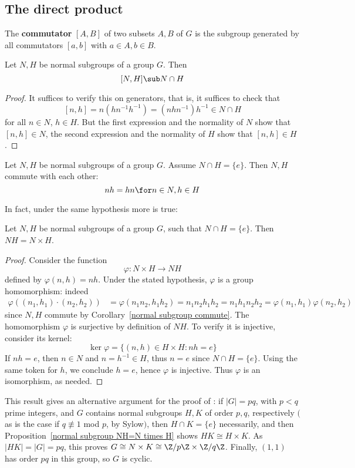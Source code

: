 \subsection{The direct product}
The \textbf{commutator} $[A,B]$ of two subsets $A,B$ of $G$ is the subgroup generated by all commutators $[a,b]$ with $a\in A, b\in B$.
\begin{lemma}\label{commutator normal subgroup}
Let $N,H$ be normal subgroups of a group $G$. Then
\[[N,H]\sub N\cap H\]
\end{lemma}
\begin{proof}
It suffices to verify this on generators, that is, it suffices to check that
\[[n,h]=n(hn^{-1}h^{-1})=(nhn^{-1})h^{-1}\in N\cap H\]
for all $n\in N$, $h\in H$. But the first expression and the normality of $N$ show that $[n,h]\in N$, the second expression and the normality of $H$ show that $[n,h]\in H$.
\end{proof}
\begin{corollary}\label{normal subgroup commute}
Let $N,H$ be normal subgroups of a group $G$. Assume $N\cap H=\{e\}$. Then $N,H$ commute with each other:
\[nh=hn\for n\in N,h\in H\]
\end{corollary}
In fact, under the same hypothesis more is true:
\begin{proposition}\label{normal subgroup NH=N times H}
Let $N,H$ be normal subgroups of a group $G$, such that $N\cap H=\{e\}$. Then $NH=N\times H$.
\end{proposition}
\begin{proof}
Consider the function
\[\varphi:N\times H\to NH\]
defined by $\varphi(n,h)=nh$. Under the stated hypothesis, $\varphi$ is a group homomorphism: indeed
\begin{align*}
\varphi((n_1,h_1)\cdot(n_2,h_2))&=\varphi(n_1n_2,h_1h_2)=n_1n_2h_1h_2=n_1h_1n_2h_2=\varphi(n_1,h_1)\varphi(n_2,h_2)
\end{align*}
since $N,H$ commute by Corollary~\ref{normal subgroup commute}. The homomorphism $\varphi$ is surjective by definition of $NH$. To verify it is injective, consider its kernel:
\[\ker\varphi=\{(n,h)\in H\times H:nh=e\}\]
If $nh=e$, then $n\in N$ and $n=h^{-1}\in H$, thus $n=e$ since $N\cap H=\{e\}$. Using the same token for $h$, we conclude $h=e$, hence $\varphi$ is injective. Thus $\varphi$ is an isomorphism, as needed.
\end{proof}
\begin{remark}
This result gives an alternative argument for the proof of : if $|G|=pq$, with $p<q$ prime integers, and $G$ contains normal subgroups $H,K$ of order $p,q$, respectively $($as is the case if $q\not\equiv 1$ mod $p$, by Sylow$)$, then $H\cap K=\{e\}$ necessarily, and then Proposition~\ref{normal subgroup NH=N times H} shows $HK\cong H\times K$. As $|HK|=|G|=pq$, this proves $G\cong N\times K\cong\Z/p\Z\times\Z/q\Z$. Finally, $(1,1)$ has order $pq$ in this group, so $G$ is cyclic.
\end{remark}
